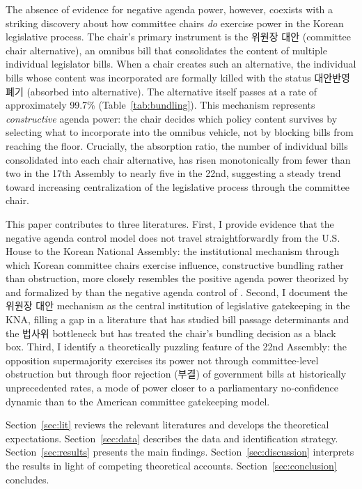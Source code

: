 \documentclass[11pt]{article}
\begin{document}
The absence of evidence for negative agenda power, however, coexists with a striking discovery about how committee chairs \textit{do} exercise power in the Korean legislative process. The chair's primary instrument is the 위원장 대안 (committee chair alternative), an omnibus bill that consolidates the content of multiple individual legislator bills. When a chair creates such an alternative, the individual bills whose content was incorporated are formally killed with the status 대안반영폐기 (absorbed into alternative). The alternative itself passes at a rate of approximately 99.7\% (Table~\ref{tab:bundling}). This mechanism represents \textit{constructive} agenda power: the chair decides which policy content survives by selecting what to incorporate into the omnibus vehicle, not by blocking bills from reaching the floor. Crucially, the absorption ratio, the number of individual bills consolidated into each chair alternative, has risen monotonically from fewer than two in the 17th Assembly to nearly five in the 22nd, suggesting a steady trend toward increasing centralization of the legislative process through the committee chair.

This paper contributes to three literatures. First, I provide evidence that the negative agenda control model does not travel straightforwardly from the U.S. House to the Korean National Assembly: the institutional mechanism through which Korean committee chairs exercise influence, constructive bundling rather than obstruction, more closely resembles the positive agenda power theorized by \citet{shepsle1987} and formalized by \citet{ali2023} than the negative agenda control of \citet{cox2005}. Second, I document the 위원장 대안 mechanism as the central institution of legislative gatekeeping in the KNA, filling a gap in a literature that has studied bill passage determinants \citep{parkshin2019, anparklee2025} and the 법사위 bottleneck \citep{ko2017} but has treated the chair's bundling decision as a black box. Third, I identify a theoretically puzzling feature of the 22nd Assembly: the opposition supermajority exercises its power not through committee-level obstruction but through floor rejection (부결) of government bills at historically unprecedented rates, a mode of power closer to a parliamentary no-confidence dynamic than to the American committee gatekeeping model.

Section~\ref{sec:lit} reviews the relevant literatures and develops the theoretical expectations. Section~\ref{sec:data} describes the data and identification strategy. Section~\ref{sec:results} presents the main findings. Section~\ref{sec:discussion} interprets the results in light of competing theoretical accounts. Section~\ref{sec:conclusion} concludes.
\end{document}
